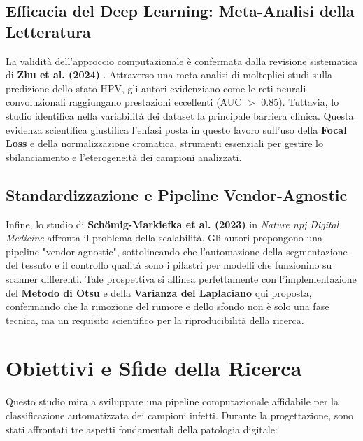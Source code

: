 \subsection{Efficacia del Deep Learning: Meta-Analisi della Letteratura}
La validità dell'approccio computazionale è confermata dalla revisione sistematica di \textbf{Zhu et al. (2024)} \cite{zhu2024deep}. Attraverso una meta-analisi di molteplici studi sulla predizione dello stato HPV, gli autori evidenziano come le reti neurali convoluzionali raggiungano prestazioni eccellenti (AUC $>$ 0.85). Tuttavia, lo studio identifica nella variabilità dei dataset la principale barriera clinica. Questa evidenza scientifica giustifica l'enfasi posta in questo lavoro sull'uso della \textbf{Focal Loss} e della normalizzazione cromatica, strumenti essenziali per gestire lo sbilanciamento e l'eterogeneità dei campioni analizzati.

\subsection{Standardizzazione e Pipeline Vendor-Agnostic}
Infine, lo studio di \textbf{Schömig-Markiefka et al. (2023)} \cite{schomig2023deep} in \textit{Nature npj Digital Medicine} affronta il problema della scalabilità. Gli autori propongono una pipeline "vendor-agnostic", sottolineando che l'automazione della segmentazione del tessuto e il controllo qualità sono i pilastri per modelli che funzionino su scanner differenti. Tale prospettiva si allinea perfettamente con l'implementazione del \textbf{Metodo di Otsu} e della \textbf{Varianza del Laplaciano} qui proposta, confermando che la rimozione del rumore e dello sfondo non è solo una fase tecnica, ma un requisito scientifico per la riproducibilità della ricerca.


\section{Obiettivi e Sfide della Ricerca} 
Questo studio mira a sviluppare una pipeline computazionale affidabile per la classificazione automatizzata dei campioni infetti. Durante la progettazione, sono stati affrontati tre aspetti fondamentali della patologia digitale:

